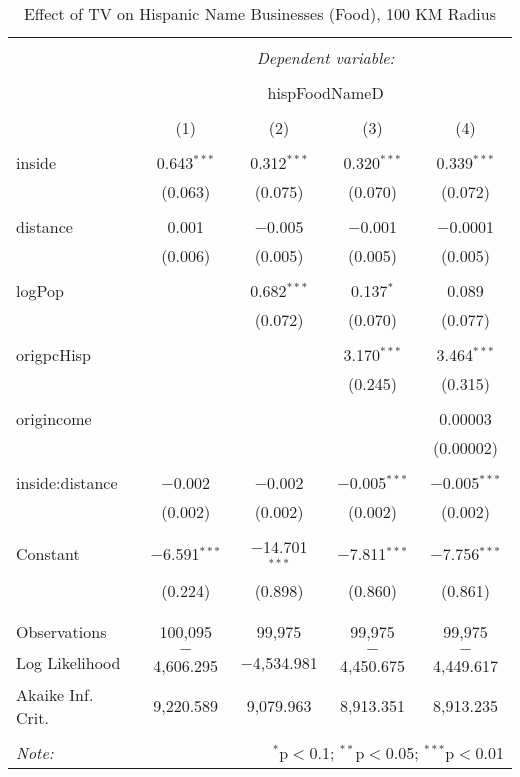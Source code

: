 
\begin{table}[!htbp] \centering 
  \caption{Effect of TV on Hispanic Name Businesses (Food), 100 KM Radius} 
  \label{} 
\begin{tabular}{@{\extracolsep{-5pt}}lcccc} 
\\[-1.8ex]\hline 
\hline \\[-1.8ex] 
 & \multicolumn{4}{c}{\textit{Dependent variable:}} \\ 
\cline{2-5} 
\\[-1.8ex] & \multicolumn{4}{c}{hispFoodNameD} \\ 
\\[-1.8ex] & (1) & (2) & (3) & (4)\\ 
\hline \\[-1.8ex] 
 inside & 0.643$^{***}$ & 0.312$^{***}$ & 0.320$^{***}$ & 0.339$^{***}$ \\ 
  & (0.063) & (0.075) & (0.070) & (0.072) \\ 
  & & & & \\ 
 distance & 0.001 & $-$0.005 & $-$0.001 & $-$0.0001 \\ 
  & (0.006) & (0.005) & (0.005) & (0.005) \\ 
  & & & & \\ 
 logPop &  & 0.682$^{***}$ & 0.137$^{*}$ & 0.089 \\ 
  &  & (0.072) & (0.070) & (0.077) \\ 
  & & & & \\ 
 origpcHisp &  &  & 3.170$^{***}$ & 3.464$^{***}$ \\ 
  &  &  & (0.245) & (0.315) \\ 
  & & & & \\ 
 origincome &  &  &  & 0.00003 \\ 
  &  &  &  & (0.00002) \\ 
  & & & & \\ 
 inside:distance & $-$0.002 & $-$0.002 & $-$0.005$^{***}$ & $-$0.005$^{***}$ \\ 
  & (0.002) & (0.002) & (0.002) & (0.002) \\ 
  & & & & \\ 
 Constant & $-$6.591$^{***}$ & $-$14.701$^{***}$ & $-$7.811$^{***}$ & $-$7.756$^{***}$ \\ 
  & (0.224) & (0.898) & (0.860) & (0.861) \\ 
  & & & & \\ 
\hline \\[-1.8ex] 
Observations & 100,095 & 99,975 & 99,975 & 99,975 \\ 
Log Likelihood & $-$4,606.295 & $-$4,534.981 & $-$4,450.675 & $-$4,449.617 \\ 
Akaike Inf. Crit. & 9,220.589 & 9,079.963 & 8,913.351 & 8,913.235 \\ 
\hline 
\hline \\[-1.8ex] 
\textit{Note:}  & \multicolumn{4}{r}{$^{*}$p$<$0.1; $^{**}$p$<$0.05; $^{***}$p$<$0.01} \\ 
\end{tabular} 
\end{table} 
